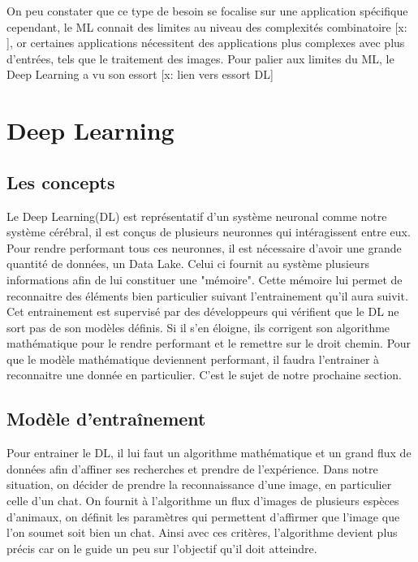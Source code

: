 \documentclass[12pt,a4paper]{report}
\begin{document}
On peu constater que ce type de besoin se focalise sur une application spécifique cependant, le ML connait des limites au niveau des complexités combinatoire [x: ], or certaines applications nécessitent des applications plus complexes avec plus d'entrées, tels que le traitement des images. Pour palier aux limites du ML, le Deep Learning a vu son essort [x: lien vers essort DL]
\pagebreak



\chapter{Deep Learning}
\section{Les concepts}

Le Deep Learning(DL) est représentatif d'un système neuronal comme notre système cérébral, il est conçus de plusieurs neuronnes qui intéragissent entre eux. Pour rendre performant tous ces neuronnes, il est nécessaire d'avoir une grande quantité de données, un Data Lake. Celui ci fournit au système plusieurs informations afin de lui constituer une "mémoire". Cette mémoire lui permet de reconnaitre des éléments bien particulier suivant l'entrainement qu'il aura suivit. Cet entrainement est supervisé par des développeurs qui vérifient que le DL ne sort pas de son modèles définis.
Si il s'en éloigne, ils corrigent son algorithme mathématique pour le rendre performant et le remettre sur le droit chemin. Pour que le modèle mathématique deviennent performant, il faudra l'entrainer à reconnaitre une donnée en particulier. C'est le sujet de notre prochaine section.


\pagebreak

\section{Modèle d'entraînement}

Pour entrainer le DL, il lui faut un algorithme mathématique et un grand flux de données afin d'affiner ses recherches et prendre de l'expérience. Dans notre situation, on décider de prendre la reconnaissance d'une image, en particulier celle d'un chat.
On fournit à l'algorithme un flux d'images de plusieurs espèces d'animaux, on définit les paramètres qui permettent d'affirmer que l'image que l'on soumet soit bien un chat. Ainsi avec ces critères, l'algorithme devient plus précis car on le guide un peu sur l'objectif qu'il doit atteindre.
 
\end{document}
